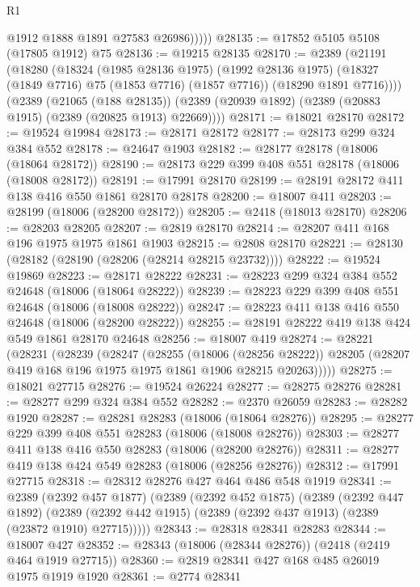 \begin{lexlean}{R1}
\begin{coremodule}
              @1912
              @1888
              @1891
              @27583
              @26986)))))
@28135 := @17852 @5105 @5108 (@17805 @1912) @75
@28136 := @19215 @28135
@28170 := @2389
    (@21191
      (@18280
        (@18324
          (@1985 @28136 @1975)
          (@1992 @28136 @1975)
          (@18327 (@1849 @7716) @75 (@1853 @7716) (@1857 @7716))
          (@18290 @1891 @7716))))
    (@2389
      (@21065 (@188 @28135))
      (@2389 (@20939 @1892) (@2389 (@20883 @1915) (@2389 (@20825 @1913) @22669))))
@28171 := @18021 @28170
@28172 := @19524 @19984
@28173 := @28171 @28172
@28177 := @28173 @299 @324 @384 @552
@28178 := @24647 @1903
@28182 := @28177 @28178 (@18006 (@18064 @28172))
@28190 := @28173 @229 @399 @408 @551 @28178 (@18006 (@18008 @28172))
@28191 := @17991 @28170
@28199 := @28191 @28172 @411 @138 @416 @550 @1861 @28170 @28178
@28200 := @18007 @411
@28203 := @28199 (@18006 (@28200 @28172))
@28205 := @2418 (@18013 @28170)
@28206 := @28203 @28205
@28207 := @2819 @28170
@28214 := @28207 @411 @168 @196 @1975 @1975 @1861 @1903
@28215 := @2808 @28170
@28221 := @28130 (@28182 (@28190 (@28206 (@28214 @28215 @23732))))
@28222 := @19524 @19869
@28223 := @28171 @28222
@28231 := @28223 @299 @324 @384 @552 @24648 (@18006 (@18064 @28222))
@28239 := @28223 @229 @399 @408 @551 @24648 (@18006 (@18008 @28222))
@28247 := @28223 @411 @138 @416 @550 @24648 (@18006 (@28200 @28222))
@28255 := @28191 @28222 @419 @138 @424 @549 @1861 @28170 @24648
@28256 := @18007 @419
@28274 := @28221
    (@28231
      (@28239
        (@28247
          (@28255
            (@18006 (@28256 @28222))
            @28205
            (@28207 @419 @168 @196 @1975 @1975 @1861 @1906 @28215 @20263)))))
@28275 := @18021 @27715
@28276 := @19524 @26224
@28277 := @28275 @28276
@28281 := @28277 @299 @324 @384 @552
@28282 := @2370 @26059
@28283 := @28282 @1920
@28287 := @28281 @28283 (@18006 (@18064 @28276))
@28295 := @28277 @229 @399 @408 @551 @28283 (@18006 (@18008 @28276))
@28303 := @28277 @411 @138 @416 @550 @28283 (@18006 (@28200 @28276))
@28311 := @28277 @419 @138 @424 @549 @28283 (@18006 (@28256 @28276))
@28312 := @17991 @27715
@28318 := @28312 @28276 @427 @464 @486 @548 @1919
@28341 := @2389
    (@2392 @457 @1877)
    (@2389
      (@2392 @452 @1875)
      (@2389
        (@2392 @447 @1892)
        (@2389 (@2392 @442 @1915) (@2389 (@2392 @437 @1913) (@2389 (@23872 @1910) @27715)))))
@28343 := @28318 @28341 @28283
@28344 := @18007 @427
@28352 := @28343 (@18006 (@28344 @28276)) (@2418 (@2419 @464 @1919 @27715))
@28360 := @2819 @28341 @427 @168 @485 @26019 @1975 @1919 @1920
@28361 := @2774 @28341

\end{coremodule}
\end{lexlean}
